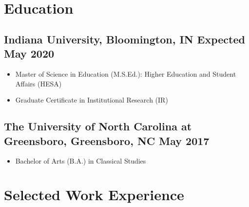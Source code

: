 \documentclass{article}
\begin{document}
\renewcommand{\headrulewidth}{0pt}

\hspace{0.10in}
\section*{Education\hrulefill} 

\subsection*{Indiana University, Bloomington, IN \hfill \textnormal{ Expected May 2020}}
\begin{itemize}
\item Master of Science in Education (M.S.Ed.): Higher Education and  Student Affairs (HESA)
\item Graduate Certificate in Institutional Research (IR)
\end{itemize}

\subsection*{The University of North Carolina at Greensboro, Greensboro, NC
  \hfill \textnormal{ May 2017}}
\begin{itemize}
\item Bachelor of Arts (B.A.) in Classical Studies
\end{itemize}

\section*{Selected Work Experience\hrulefill}
\end{document}
